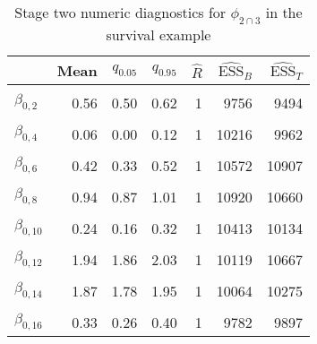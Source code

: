 \begin{table}

\caption{\label{tab:surv-stage-two-diag-phi-23}Stage two numeric diagnostics for $\phi_{2 \cap 3}$ in the survival example}
\centering
\begin{tabular}[t]{lrrrrrr}
\toprule
  & Mean & $q_{0.05}$ & $q_{0.95}$ & $\widehat{R}$ & $\widehat{\text{ESS}}_{B}$ & $\widehat{\text{ESS}}_{T}$\\
\midrule
\cellcolor{gray!6}{$\beta_{0, 1}$} & \cellcolor{gray!6}{0.14} & \cellcolor{gray!6}{0.07} & \cellcolor{gray!6}{0.21} & \cellcolor{gray!6}{1} & \cellcolor{gray!6}{9850} & \cellcolor{gray!6}{10909}\\
$\beta_{0, 2}$ & 0.56 & 0.50 & 0.62 & 1 & 9756 & 9494\\
\cellcolor{gray!6}{$\beta_{0, 3}$} & \cellcolor{gray!6}{0.25} & \cellcolor{gray!6}{0.16} & \cellcolor{gray!6}{0.34} & \cellcolor{gray!6}{1} & \cellcolor{gray!6}{10069} & \cellcolor{gray!6}{10390}\\
$\beta_{0, 4}$ & 0.06 & 0.00 & 0.12 & 1 & 10216 & 9962\\
\cellcolor{gray!6}{$\beta_{0, 5}$} & \cellcolor{gray!6}{0.30} & \cellcolor{gray!6}{0.24} & \cellcolor{gray!6}{0.37} & \cellcolor{gray!6}{1} & \cellcolor{gray!6}{10940} & \cellcolor{gray!6}{11118}\\
$\beta_{0, 6}$ & 0.42 & 0.33 & 0.52 & 1 & 10572 & 10907\\
\cellcolor{gray!6}{$\beta_{0, 7}$} & \cellcolor{gray!6}{1.73} & \cellcolor{gray!6}{1.66} & \cellcolor{gray!6}{1.80} & \cellcolor{gray!6}{1} & \cellcolor{gray!6}{10409} & \cellcolor{gray!6}{10799}\\
$\beta_{0, 8}$ & 0.94 & 0.87 & 1.01 & 1 & 10920 & 10660\\
\cellcolor{gray!6}{$\beta_{0, 9}$} & \cellcolor{gray!6}{0.78} & \cellcolor{gray!6}{0.70} & \cellcolor{gray!6}{0.85} & \cellcolor{gray!6}{1} & \cellcolor{gray!6}{10272} & \cellcolor{gray!6}{9939}\\
$\beta_{0, 10}$ & 0.24 & 0.16 & 0.32 & 1 & 10413 & 10134\\
\cellcolor{gray!6}{$\beta_{0, 11}$} & \cellcolor{gray!6}{0.56} & \cellcolor{gray!6}{0.49} & \cellcolor{gray!6}{0.64} & \cellcolor{gray!6}{1} & \cellcolor{gray!6}{10618} & \cellcolor{gray!6}{9742}\\
$\beta_{0, 12}$ & 1.94 & 1.86 & 2.03 & 1 & 10119 & 10667\\
\cellcolor{gray!6}{$\beta_{0, 13}$} & \cellcolor{gray!6}{0.67} & \cellcolor{gray!6}{0.61} & \cellcolor{gray!6}{0.73} & \cellcolor{gray!6}{1} & \cellcolor{gray!6}{10270} & \cellcolor{gray!6}{10611}\\
$\beta_{0, 14}$ & 1.87 & 1.78 & 1.95 & 1 & 10064 & 10275\\
\cellcolor{gray!6}{$\beta_{0, 15}$} & \cellcolor{gray!6}{0.81} & \cellcolor{gray!6}{0.75} & \cellcolor{gray!6}{0.87} & \cellcolor{gray!6}{1} & \cellcolor{gray!6}{10019} & \cellcolor{gray!6}{9039}\\
$\beta_{0, 16}$ & 0.33 & 0.26 & 0.40 & 1 & 9782 & 9897\\
\bottomrule
\end{tabular}
\end{table}